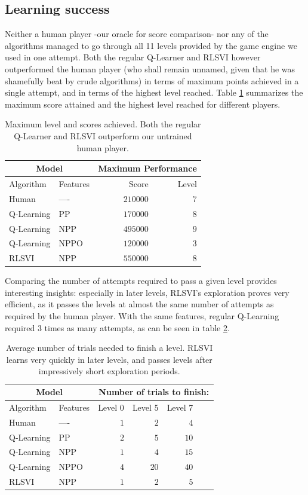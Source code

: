 \documentclass[fleqn,10pt]{SelfArx} %
\begin{document}
\subsection{Learning success}

Neither a human player -our oracle for score comparison- nor any of the algorithms managed to go through all 11 levels provided by the game engine we used in one attempt. Both the regular Q-Learner and RLSVI however outperformed the human player (who shall remain unnamed, given that he was shamefully beat by crude algorithms) in terms of maximum points achieved in a single attempt, and in terms of the highest level reached. Table \ref{tab:max_score} summarizes the maximum score attained and the highest level reached for different players.

\begin{table}[hbt]
\centering
\begin{tabular}{llrr}
\toprule
\multicolumn{2}{c}{Model} & \multicolumn{2}{c}{Maximum Performance}\\
\midrule
Algorithm & Features & Score & Level \\
\midrule
Human & ---- & $210000$ & $7$  \\
Q-Learning & PP & $170000$ & $8$ \\
Q-Learning & NPP & $495000$ & $9$ \\
Q-Learning & NPPO & $120000$ & $3$  \\
RLSVI & NPP & $550000$ & $8$ \\
\bottomrule
\end{tabular}
\caption{Maximum level and scores achieved. Both the regular Q-Learner and RLSVI outperform our untrained human player.}
\label{tab:max_score}
\end{table}


Comparing the number of attempts required to pass a given level provides interesting insights: especially in later levels, RLSVI's exploration proves very efficient, as it passes the levels at almost the same number of attempts as required by the human player. With the same features, regular Q-Learning required 3 times as many attempts, as can be seen in table \ref{tab:num_trials}.

\begin{table}[hbt]
\centering
\begin{tabular}{llrrrrr}
\toprule
\multicolumn{2}{c}{Model} & \multicolumn{5}{c}{Number of trials to finish:}\\
\midrule
Algorithm & Features & Level 0 & Level 5 & Level 7 \\
\midrule
Human & ---- & $1$ & $2$ & $4$ \\
Q-Learning & PP & $2$ & $5$ & $10$ \\
Q-Learning & NPP & $1$ & $4$ & $15$ \\
Q-Learning & NPPO & $4$ & $20$ & $40$ \\
RLSVI & NPP & $1$ & $2$ & $5$ \\
\bottomrule
\end{tabular}
\caption{Average number of trials needed to finish a level. RLSVI learns very quickly in later levels, and passes levels after impressively short exploration periods.}
\label{tab:num_trials}
\end{table}
\end{document}
